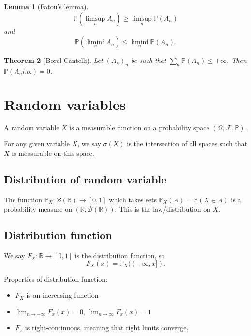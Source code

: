 \documentclass{article}
\newtheorem{theorem}{Theorem}
\newtheorem{lemma}[theorem]{Lemma}
\theoremstyle{definition}
\numberwithin{theorem}{section}
\numberwithin{equation}{section}
\begin{document}
\begin{lemma}[Fatou's lemma]
	\begin{equation}
		\mathbb{P}(\limsup_n A_n) \geq \limsup_n \mathbb{P}(A_n)
	\end{equation} and \begin{equation}
	\mathbb{P}(\liminf_n A_n) \leq \liminf_n \mathbb{P}(A_n).
	\end{equation}
\end{lemma}

\begin{theorem}[Borel-Cantelli]
	Let $(A_n)_n$ be such that $\sum_n \mathbb{P}(A_n) \leq +\infty$. Then $\mathbb{P}(A_n i.o.) = 0$. 
\end{theorem}


\section{Random variables}
A random variable $X$ is a measurable function on a probability space  $(\Omega, \mathcal{F}, \mathbb{P})$. 

For any given variable $X$, we say $\sigma(X)$ is the intersection of all spaces such that $X$ is measurable on this space. 

\subsection{Distribution of random variable}

The function $\mathbb{P}_X: \mathcal{B}(\mathbb{R}) \rightarrow [0,1]$ which takes sets $\mathbb{P}_X(A) = \mathbb{P}(X \in A)$ is a probability measure on $(\mathbb{R}, \mathcal{B}(\mathbb{R}))$. This is the law/distribution on $X$. 

\subsection{Distribution function}
We say $F_X : \mathbb{R} \rightarrow [0, 1]$ is the distribution function, so
\begin{equation}
	F_X(x) = \mathbb{P}_X((-\infty, x]).
\end{equation}

Properties of distribution function:
\begin{itemize}
	\item $F_X$ is an increasing function
	\item $\lim_{n \rightarrow -\infty} F_x(x) = 0$,  $\lim_{n \rightarrow \infty} F_x(x) = 1$
	\item $F_x$ is right-continuous, meaning that right limits converge. 
\end{itemize}
\end{document}
